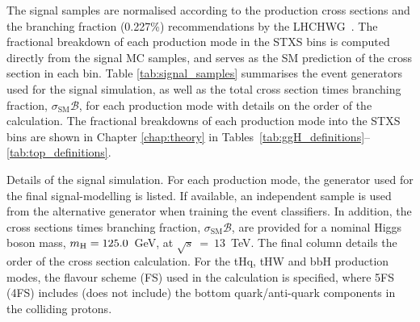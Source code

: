 The signal samples are normalised according to the production cross sections and the \Hgg branching fraction (0.227\%) recommendations by the LHCHWG~\cite{deFlorian:2016spz}. The fractional breakdown of each production mode in the STXS bins is computed directly from the signal MC samples, and serves as the SM prediction of the cross section in each bin. Table \ref{tab:signal_samples} summarises the event generators used for the signal simulation, as well as the total cross section times branching fraction, $\sigma_{\text{SM}}\mathcal{B}$, for each production mode with details on the order of the calculation. The fractional breakdowns of each production mode into the STXS bins are shown in Chapter \ref{chap:theory} in Tables~\ref{tab:ggH_definitions}--\ref{tab:top_definitions}.

\begin{table}[t]
    \caption[Signal simulation details]{Details of the signal simulation. For each production mode, the generator used for the final signal-modelling is listed. If available, an independent sample is used from the alternative generator when training the event classifiers. In addition, the cross sections times branching fraction, $\sigma_{\text{SM}}\mathcal{B}$, are provided for a nominal Higgs boson mass, $m_{\rm{H}}=125.0$~GeV, at $\sqrt{s}~=~13$~TeV. The final column details the order of the cross section calculation. For the tHq, tHW and bbH production modes, the flavour scheme (FS) used in the calculation is specified, where 5FS (4FS) includes (does not include) the bottom quark/anti-quark components in the colliding protons.}
    \label{tab:signal_samples}
    \centering
    \scriptsize
    \hspace*{-5cm}
    \renewcommand{\arraystretch}{2}
    \setlength{\tabcolsep}{5pt}
    
    \hspace*{-5cm}
\end{table}

